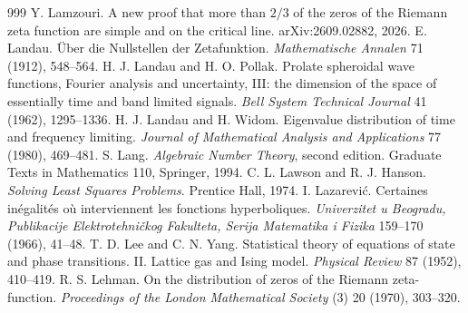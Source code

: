 \begin{thebibliography}{999}
 Y. Lamzouri. A new proof that more than $2/3$ of the zeros of the Riemann zeta function are simple and on the critical line. arXiv:2609.02882, 2026.
 E. Landau. \"Uber die Nullstellen der Zetafunktion. \emph{Mathematische Annalen} 71 (1912), 548--564.
 H. J. Landau and H. O. Pollak. Prolate spheroidal wave functions, Fourier analysis and uncertainty, III: the dimension of the space of essentially time and band limited signals. \emph{Bell System Technical Journal} 41 (1962), 1295--1336.
 H. J. Landau and H. Widom. Eigenvalue distribution of time and frequency limiting. \emph{Journal of Mathematical Analysis and Applications} 77 (1980), 469--481.
 S. Lang. \emph{Algebraic Number Theory}, second edition. Graduate Texts in Mathematics 110, Springer, 1994.
 C. L. Lawson and R. J. Hanson. \emph{Solving Least Squares Problems}. Prentice Hall, 1974.
 I. Lazarevi\'c. Certaines in\'egalit\'es o\`u interviennent les fonctions hyperboliques. \emph{Univerzitet u Beogradu, Publikacije Elektrotehni\v{c}kog Fakulteta, Serija Matematika i Fizika} 159--170 (1966), 41--48.
 T. D. Lee and C. N. Yang. Statistical theory of equations of state and phase transitions. II. Lattice gas and Ising model. \emph{Physical Review} 87 (1952), 410--419.
 R. S. Lehman. On the distribution of zeros of the Riemann zeta-function. \emph{Proceedings of the London Mathematical Society} (3) 20 (1970), 303--320.

\end{thebibliography}
